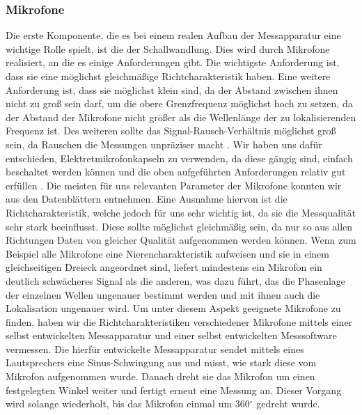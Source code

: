 \subsubsection{Mikrofone}
Die erste Komponente, die es bei einem realen Aufbau der Messapparatur eine wichtige Rolle spielt, ist die der Schallwandlung. Dies wird durch Mikrofone realisiert, an die es einige Anforderungen gibt. Die wichtigste Anforderung ist, dass sie eine möglichst gleichmäßige Richtcharakteristik haben.
Eine weitere Anforderung ist, dass sie möglichst klein sind, da der Abstand zwischen ihnen nicht zu groß sein darf, um die obere Grenzfrequenz möglichst hoch zu setzen, da der Abstand der Mikrofone nicht größer als die Wellenlänge der zu lokalisierenden Frequenz ist. Des weiteren sollte das Signal-Rausch-Verhältnis möglichst groß sein, da Rauschen die Messungen unpräziser macht \cite{Rausch}.
Wir haben uns dafür entschieden, Elektretmikrofonkapseln zu verwenden, da diese gängig sind, einfach beschaltet werden können und die oben aufgeführten Anforderungen relativ gut erfüllen \cite{elektret}.
Die meisten für uns relevanten Parameter der Mikrofone konnten wir aus den Datenblättern entnehmen. Eine Ausnahme hiervon ist die Richtcharakteristik, welche jedoch für uns sehr wichtig ist, da sie die Messqualität sehr stark beeinflusst. Diese sollte möglichst gleichmäßig sein, da nur so aus allen Richtungen Daten von gleicher Qualität aufgenommen werden können. Wenn zum Beispiel alle Mikrofone eine Nierencharakteristik aufweisen und sie in einem gleichseitigen Dreieck angeordnet sind, liefert mindestens ein Mikrofon ein deutlich schwächeres Signal als die anderen, was dazu führt, das die Phasenlage der einzelnen Wellen ungenauer bestimmt werden und mit ihnen auch die Lokalisation ungenauer wird.
Um unter diesem Aspekt geeignete Mikrofone zu finden, haben wir die Richtcharakteristiken verschiedener Mikrofone mittels einer selbst entwickelten Messapparatur und einer selbst entwickelten Messsoftware vermessen. Die hierfür entwickelte Messapparatur sendet mittels eines Lautsprechers eine Sinus-Schwingung aus und misst, wie stark diese vom Mikrofon aufgenommen wurde. Danach dreht sie das Mikrofon um einen festgelegten Winkel weiter und fertigt erneut eine Messung an. Dieser Vorgang wird solange wiederholt, bis das Mikrofon einmal um 360$^{\circ}$ gedreht wurde.

